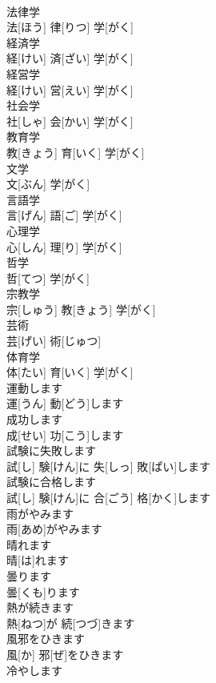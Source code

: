 \documentclass[8pt]{extreport}
\begin{document}
\begin{CJK}{UTF8}{min}
\\	法律学	
\\	法[ほう] 律[りつ] 学[がく]		
\\	経済学	
\\	経[けい] 済[ざい] 学[がく]		
\\	経営学	
\\	経[けい] 営[えい] 学[がく]		
\\	社会学	
\\	社[しゃ] 会[かい] 学[がく]		
\\	教育学	
\\	教[きょう] 育[いく] 学[がく]		
\\	文学	
\\	文[ぶん] 学[がく]		
\\	言語学	
\\	言[げん] 語[ご] 学[がく]		
\\	心理学	
\\	心[しん] 理[り] 学[がく]		
\\	哲学	
\\	哲[てつ] 学[がく]		
\\	宗教学	
\\	宗[しゅう] 教[きょう] 学[がく]		
\\	芸術	
\\	芸[げい] 術[じゅつ]		
\\	体育学	
\\	体[たい] 育[いく] 学[がく]		
\\	運動します	
\\	運[うん] 動[どう]します		
\\	成功します	
\\	成[せい] 功[こう]します		
\\	試験に失敗します	
\\	試[し] 験[けん]に 失[しっ] 敗[ぱい]します		
\\	試験に合格します	
\\	試[し] 験[けん]に 合[ごう] 格[かく]します		
\\	雨がやみます	
\\	雨[あめ]がやみます		
\\	晴れます	
\\	晴[は]れます		
\\	曇ります	
\\	曇[くも]ります		
\\	熱が続きます	
\\	熱[ねつ]が 続[つづ]きます		
\\	風邪をひきます	
\\	風[か] 邪[ぜ]をひきます		
\\	冷やします	

\end{CJK}
\end{document}
